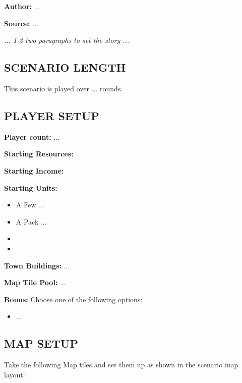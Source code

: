 
\begin{multicols*}{2}

\textbf{Author:} ...

\textbf{Source:} ...

\textit{... 1-2 two paragraphs to set the story ...}

\subsection*{\MakeUppercase{Scenario Length}}

This scenario is played over ... rounds.

\subsection*{\MakeUppercase{Player Setup}}

\textbf{Player count:} ...

\textbf{Starting Resources:}\par
{}

\textbf{Starting Income:}\par
{}

\textbf{Starting Units:}
\begin{itemize}
  \item A Few ...
  \item A Pack ...
  \item {}
  \item {}
\end{itemize}

\textbf{Town Buildings:} ...

\textbf{Map Tile Pool:} ...

\textbf{Bonus:} Choose one of the following options:

\begin{itemize}
    \item ...
\end{itemize}

\subsection*{\MakeUppercase{Map setup}}

Take the following Map tiles and set them up as shown in the scenario map layout:


\end{multicols*}
